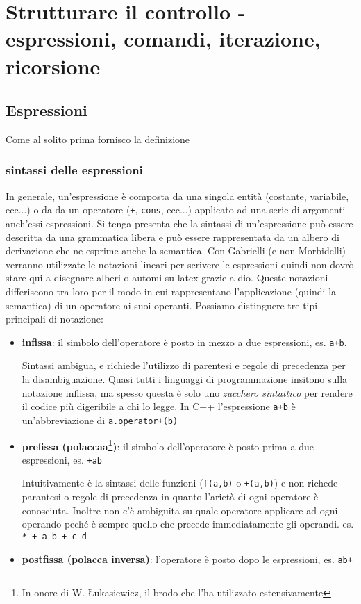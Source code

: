 \chapter{Strutturare il controllo - espressioni, comandi, iterazione, ricorsione}
\section{Espressioni}
Come al solito prima fornisco la definizione


\subsection{sintassi delle espressioni}
In generale, un'espressione è composta da una singola entità (costante, variabile, ecc...) o da da un operatore (\texttt{+}, \texttt{cons}, ecc...) applicato ad una serie di argomenti anch'essi espressioni. Si tenga presenta che la sintassi di un'espressione può essere descritta da una grammatica libera e può essere rappresentata da un albero di derivazione che ne esprime anche la semantica. Con Gabrielli (e non Morbidelli) verranno utilizzate le notazioni lineari per scrivere le espressioni quindi non dovrò stare qui a disegnare alberi o automi su latex grazie a dio. Queste notazioni differiscono tra loro per il modo in cui rappresentano l'applicazione (quindi la semantica) di un operatore ai suoi operanti. Possiamo distinguere tre tipi principali di notazione:

\begin{itemize}
    \item \textbf{infissa}: il simbolo dell'operatore è posto in mezzo a due espressioni, es. \texttt{a+b}.
    
    Sintassi ambigua, e richiede l'utilizzo di parentesi e regole di precedenza per la disambiguazione. Quasi tutti i linguaggi di programmazione insitono sulla notazione inflissa, ma spesso questa è solo uno \textit{zucchero sintattico} per rendere il codice più digeribile a chi lo legge. In C++ l'espressione \texttt{a+b} è un'abbreviazione di \texttt{a.operator+(b)}
    \item \textbf{prefissa (polaccaa\footnote{In onore di W. Łukasiewicz, il brodo che l'ha utilizzato estensivamente})}: il simbolo dell'operatore è posto prima a due espressioni, es. \texttt{+ab}
    
    Intuitivamente è la sintassi delle funzioni (\texttt{f(a,b)} o \texttt{+(a,b)}) e non richede parantesi o regole di precedenza in quanto l'arietà di ogni operatore è conosciuta. Inoltre non c'è ambiguita su quale operatore applicare ad ogni operando peché è sempre quello che precede immediatamente gli operandi. es. \texttt{* + a b + c d}
    \item \textbf{postfissa (polacca inversa)}: l'operatore è posto dopo le espressioni, es. \texttt{ab+}
\end{itemize}

